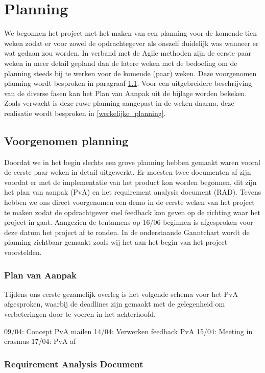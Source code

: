\section{Planning}
\label{Planning}

We begonnen het project met het maken van een planning voor de komende tien
weken zodat er voor zowel de opdrachtegever als onszelf duidelijk was wanneer
er wat gedaan zou worden. In verband met de Agile methoden zijn de eerste paar
weken in meer detail gepland dan de latere weken met de bedoeling om de
planning steeds bij te werken voor de komende (paar) weken. Deze voorgenomen
planning wordt besproken in paragraaf \ref{voorgenomen_planning}. Voor een
uitgebreidere beschrijving van de diverse fasen kan het Plan van Aanpak uit de
bijlage worden bekeken. Zoals verwacht is deze ruwe planning aangepast in de
weken daarna, deze realisatie wordt besproken in \ref{werkelijke_planning}.

\subsection{Voorgenomen planning}
\label{voorgenomen_planning}

Doordat we in het begin slechts een grove planning hebben gemaakt waren vooral
de eerste paar weken in detail uitgewerkt. Er moesten twee documenten af zijn
voordat er met de implementatie van het product kon worden begonnen, dit zijn
het plan van aanpak (PvA) en het requirement analysis document (RAD). Tevens
hebben we ons direct voorgenomen een demo in de eerste weken van het project te
maken zodat de opdrachtgever snel feedback kon geven op de richting waar het
project in gaat.
Aangezien de tentamens op 16/06 beginnen is afgesproken
voor deze datum het project af te ronden. In de onderstaande Ganntchart wordt
de planning zichtbaar gemaakt zoals wij het aan het begin van het project
voorstelden.

\subsubsection{Plan van Aanpak}

Tijdens ons eerste gezamelijk overleg is het volgende schema voor het PvA
afgesproken, waarbij de deadlines zijn gemaakt met de gelegenheid om
verbeteringen door te voeren in het achterhoofd.

09/04: Concept PvA mailen
14/04: Verwerken feedback PvA
15/04: Meeting in erasmus
17/04: PvA af

\subsubsection{Requirement Analysis Document}

